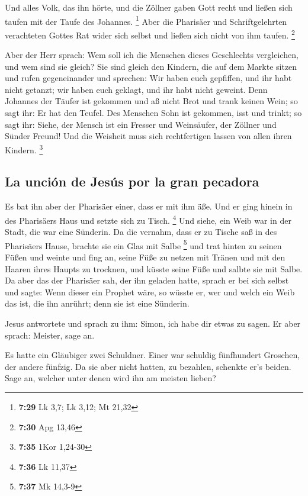  Und alles Volk, das ihn hörte, und die Zöllner gaben
Gott recht und ließen sich taufen mit der Taufe des Johannes.
\footnote{\textbf{7:29} Lk 3,7; Lk 3,12; Mt 21,32}  Aber
die Pharisäer und Schriftgelehrten verachteten Gottes Rat wider sich
selbst und ließen sich nicht von ihm taufen. \footnote{\textbf{7:30} Apg
  13,46}

 Aber der Herr sprach: Wem soll ich die Menschen dieses
Geschlechts vergleichen, und wem sind sie gleich?  Sie
sind gleich den Kindern, die auf dem Markte sitzen und rufen
gegeneinander und sprechen: Wir haben euch gepfiffen, und ihr habt nicht
getanzt; wir haben euch geklagt, und ihr habt nicht geweint.
 Denn Johannes der Täufer ist gekommen und aß nicht Brot
und trank keinen Wein; so sagt ihr: Er hat den Teufel. 
Des Menschen Sohn ist gekommen, isst und trinkt; so sagt ihr: Siehe, der
Mensch ist ein Fresser und Weinsäufer, der Zöllner und Sünder Freund!
 Und die Weisheit muss sich rechtfertigen lassen von
allen ihren Kindern. \footnote{\textbf{7:35} 1Kor 1,24-30}

\hypertarget{la-unciuxf3n-de-jesuxfas-por-la-gran-pecadora}{%
\subsection{La unción de Jesús por la gran
pecadora}\label{la-unciuxf3n-de-jesuxfas-por-la-gran-pecadora}}

 Es bat ihn aber der Pharisäer einer, dass er mit ihm
äße. Und er ging hinein in des Pharisäers Haus und setzte sich zu Tisch.
\footnote{\textbf{7:36} Lk 11,37}  Und siehe, ein Weib
war in der Stadt, die war eine Sünderin. Da die vernahm, dass er zu
Tische saß in des Pharisäers Hause, brachte sie ein Glas mit Salbe
\footnote{\textbf{7:37} Mk 14,3-9}  und trat hinten zu
seinen Füßen und weinte und fing an, seine Füße zu netzen mit Tränen und
mit den Haaren ihres Haupts zu trocknen, und küsste seine Füße und
salbte sie mit Salbe.  Da aber das der Pharisäer sah, der
ihn geladen hatte, sprach er bei sich selbst und sagte: Wenn dieser ein
Prophet wäre, so wüsste er, wer und welch ein Weib das ist, die ihn
anrührt; denn sie ist eine Sünderin.

 Jesus antwortete und sprach zu ihm: Simon, ich habe dir
etwas zu sagen. Er aber sprach: Meister, sage an.

 Es hatte ein Gläubiger zwei Schuldner. Einer war
schuldig fünfhundert Groschen, der andere fünfzig.  Da
sie aber nicht hatten, zu bezahlen, schenkte er's beiden. Sage an,
welcher unter denen wird ihn am meisten lieben?

